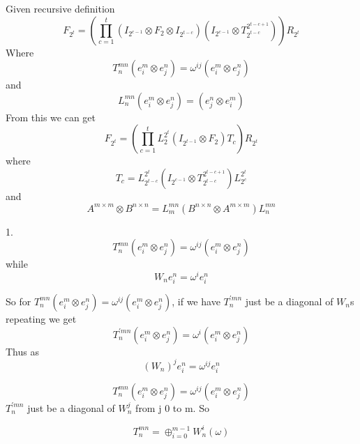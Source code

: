 \documentclass{article}
\begin{document}
	Given recursive definition
	\begin{equation}
		F_{2^t} = (\prod_{c=1}^{t}(I_{2^{c-1}}\otimes F_2 \otimes I_{2^{t-c}})(I_{2^{c-1}} \otimes T^{2^{t-c+1}}_{2^{t-c}}))R_{2^t}
	\end{equation}
	Where
	\begin{equation}
		T^{mn}_n(e^m_i \otimes e^n_j)=\omega^{ij}(e^m_i \otimes e^n_j)
	\end{equation}
	and 
	\begin{equation}
		L^{mn}_n(e^m_i \otimes e^n_j) = (e^n_j \otimes e^m_i)
	\end{equation}
	From this we can get
	\begin{equation}
		F_{2^t} = (\prod_{c=1}^{t}L_2^{2^t}(I_{2^{t-1}}\otimes F_2)T_c)R_{2^t}
	\end{equation}
	where 
	\begin{equation}
		T_c = L^{2^t}_{2^{t-c}}(I_{2^{c-1}} \otimes T^{2^{t-c+1}}_{2^{t-c}})L^{2^t}_{2^c}
	\end{equation}
	and
	\begin{equation}
		A^{m \times m} \otimes B^{n\times n}=L^{mn}_m(B^{n \times n} \otimes A^{m \times m})L^{mn}_n
	\end{equation}

	1.
	\begin{equation}
		T^{mn}_n(e^m_i \otimes e^n_j)=\omega^{ij}(e^m_i \otimes e^n_j)
	\end{equation}
	while
	\begin{equation}
		W_ne^n_i= \omega^ie^n_i
	\end{equation}
	
	So for $T^{mn}_n(e^m_i \otimes e^n_j)=\omega^{ij}(e^m_i \otimes e^n_j)$, if we have
	$T^{'mn}_n$ just be a diagonal of $W_n$s repeating we get
	\begin{equation}
		T^{'mn}_n(e^m_i \otimes e^n_j)=\omega^{i}(e^m_i \otimes e^n_j)
	\end{equation}
	Thus as 
	\begin{equation}
		(W_n)^je^n_i= \omega^{ij}e^n_i
	\end{equation}
	
	\begin{equation}
		T^{mn}_n(e^m_i \otimes e^n_j)=\omega^{ij}(e^m_i \otimes e^n_j)
	\end{equation}
	$T^{'mn}_n$ just be a diagonal of $W_n^j$ from j 0 to m. So
	
	\begin{equation}
		T^{mn}_n = \oplus_{i=0}^{m-1} W^i_n(\omega)
	\end{equation}
	
\end{document}
